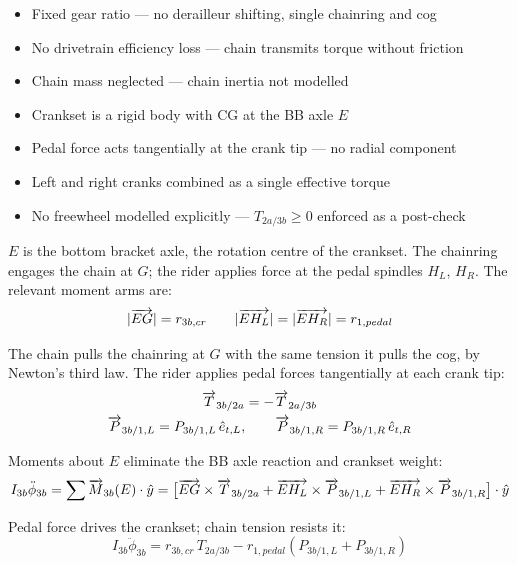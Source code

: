 \begin{aiblock}
\begin{itemize}
    \item Fixed gear ratio --- no derailleur shifting, single chainring and cog
    \item No drivetrain efficiency loss --- chain transmits torque without friction
    \item Chain mass neglected --- chain inertia not modelled
    \item Crankset is a rigid body with CG at the BB axle $E$
    \item Pedal force acts tangentially at the crank tip --- no radial component
    \item Left and right cranks combined as a single effective torque
    \item No freewheel modelled explicitly --- $T_{2a/3b} \ge 0$ enforced as a post-check
\end{itemize}

$E$ is the bottom bracket axle, the rotation centre of the crankset. The chainring engages the chain at $G$; the rider applies force at the pedal spindles $H_L$, $H_R$. The relevant moment arms are:
\begin{equation}
    |\overrightarrow{EG}| = r_{3b,cr} \qquad |\overrightarrow{EH_L}| = |\overrightarrow{EH_R}| = r_{1,pedal}
\end{equation}

The chain pulls the chainring at $G$ with the same tension it pulls the cog, by Newton's third law. The rider applies pedal forces tangentially at each crank tip:
\begin{gather}
    \overrightarrow{T}_{3b/2a} = -\overrightarrow{T}_{2a/3b} \\
    \overrightarrow{P}_{3b/1,L} = P_{3b/1,L}\,\hat{e}_{t,L}, \qquad \overrightarrow{P}_{3b/1,R} = P_{3b/1,R}\,\hat{e}_{t,R}
\end{gather}

Moments about $E$ eliminate the BB axle reaction and crankset weight:
\begin{equation}
    I_{3b}\ddot{\phi}_{3b} = \sum \overrightarrow{M}_{3b}(E)\cdot\hat{y}
        = \bigl[\overrightarrow{EG}\times\overrightarrow{T}_{3b/2a}
          + \overrightarrow{EH_L}\times\overrightarrow{P}_{3b/1,L}
          + \overrightarrow{EH_R}\times\overrightarrow{P}_{3b/1,R}\bigr]\cdot\hat{y}
\end{equation}

Pedal force drives the crankset; chain tension resists it:
\begin{equation}
    I_{3b}\ddot{\phi}_{3b} = r_{3b,cr}\,T_{2a/3b} - r_{1,pedal}\left(P_{3b/1,L} + P_{3b/1,R}\right)
\end{equation}


\end{aiblock}
